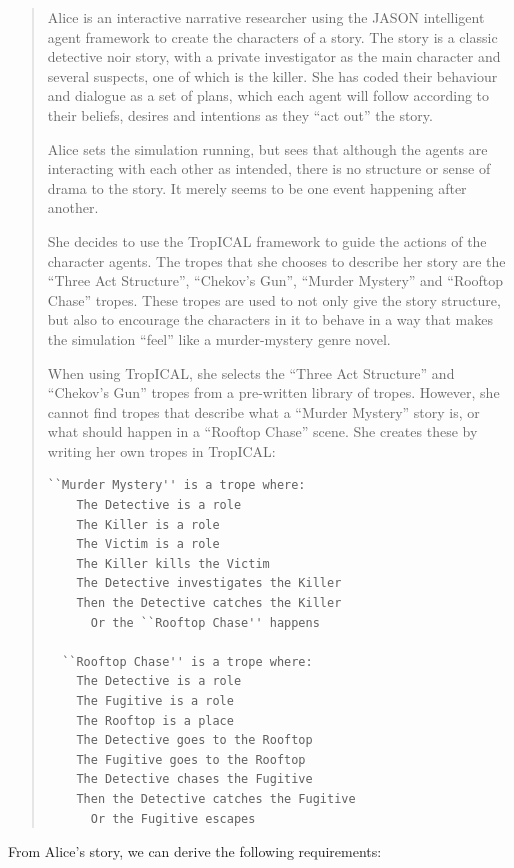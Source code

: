 \documentclass[11pt]{report}
\begin{document}
\begin{quote}
  Alice is an interactive narrative researcher using the JASON intelligent agent
  framework to create the characters of a story. The story is a classic
  detective noir story, with a private investigator as the main character and
  several suspects, one of which is the killer. She has coded their behaviour
  and dialogue as a set of plans, which each agent will follow according to
  their beliefs, desires and intentions as they ``act out'' the story.

  Alice sets the simulation running, but sees that although the agents are interacting
  with each other as intended, there is no structure or sense of drama to the
  story. It merely seems to be one event happening after another.

  She decides to use the TropICAL framework to guide the actions of the
  character agents. The tropes that she chooses to describe her story are the
  ``Three Act Structure'', ``Chekov's Gun'', ``Murder Mystery'' and ``Rooftop
  Chase'' tropes. These tropes are used to not only give the story structure,
  but also to encourage the characters in it to behave in a way that makes the
  simulation ``feel'' like a murder-mystery genre novel.

  When using TropICAL, she selects the ``Three Act Structure'' and ``Chekov's
  Gun'' tropes from a pre-written library of tropes. However, she cannot find
  tropes that describe what a ``Murder Mystery'' story is, or what should happen
  in a ``Rooftop Chase'' scene. She creates these by writing her own tropes in TropICAL:

  \begin{lstlisting}[showstringspaces=false]
  ``Murder Mystery'' is a trope where:
    The Detective is a role
    The Killer is a role
    The Victim is a role
    The Killer kills the Victim
    The Detective investigates the Killer
    Then the Detective catches the Killer
      Or the ``Rooftop Chase'' happens

  ``Rooftop Chase'' is a trope where:
    The Detective is a role
    The Fugitive is a role
    The Rooftop is a place
    The Detective goes to the Rooftop
    The Fugitive goes to the Rooftop
    The Detective chases the Fugitive
    Then the Detective catches the Fugitive
      Or the Fugitive escapes
\end{lstlisting}
\end{quote}

From Alice's story, we can derive the following requirements:
\end{document}

